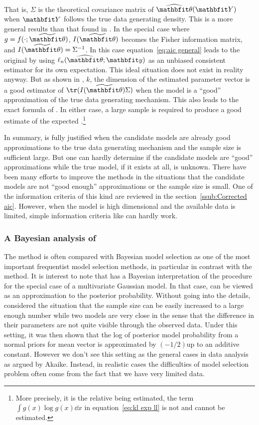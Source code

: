 \documentclass[10pt, hyper, bib, fontset=Lucida,
linespread=1.3, typearearatio=0.75]{marticle}
\begin{document}
That is, $\Sigma$ is the theoretical covariance matrix of $\hbth(\bfY)$ when
$\bfY$ follows the true data generating density. This is a more general
results than that found in \textcite{Akaike:1973uc}. In the special case where
$g = f(\cdot;\tbth)$, $I(\tbth)$ becomes the Fisher information matrix, and
$I(\tbth) = \Sigma^{-1}$. In this case equation~\eqref{eq:aic general} leads
to the original \aic by using $\ell_n(\hbth;\bfy)$ as an unbiased consistent
estimator for its own expectation. This ideal situation does not exist in
reality anyway. But as shown in \textcite{Shibata:1989tm}, $k$, the dimension
of the estimated parameter vector is a good estimator of $\tr(I(\tbth)\Sigma)$
when the model is a ``good'' approximation of the true data generating
mechanism. This also leads to the exact formula of \aic. In either case, a
large sample is required to produce a good estimate of the expected
\kl.\footnote{More precisely, it is the relative \kl being estimated, the term
  $\int g(x)\log g(x)\dd x$ in equation~\eqref{eq:kl exp ll} is not and cannot
  be estimated.}

In summary, \aic is fully justified when the candidate models are already good
approximations to the true data generating mechanism and the sample size is
sufficient large. But one can hardly determine if the candidate models are
``good'' approximations while the true model, if it exists at all, is unknown.
There have been many efforts to improve the \aic methods in the situations
that the candidate models are not ``good enough'' approximations or the sample
size is small. One of the information criteria of this kind are reviewed in
the section~\ref{ssub:Corrected aic}. However, when the model is high
dimensional and the available data is limited, simple information criteria
like \aic can hardly work.

\subsubsection{A Bayesian analysis of \protect\aic}
\label{ssub:A Bayesian analysis of aic}

The \aic method is often compared with Bayesian model selection as one of
the most important frequentist model selection methods, in particular in
contrast with the \bic method. It is interest to note that
\textcite{Akaike:1978ti} has a Bayesian interpretation of the \aic procedure
for the special case of a multivariate Gaussian model. In that case, \aic can
be viewed as an approximation to the posterior probability. Without going into
the details, \textcite{Akaike:1978ti} considered the situation that the sample
size can be easily increased to a large enough number while two models are
very close in the sense that the difference in their parameters are not quite
visible through the observed data. Under this setting, it was then shown that
the log of posterior model probability from a normal priors for mean vector is
approximated by $(-1/2)$\aic up to an additive constant. However we don't see
this setting as the general cases in data analysis as argued by Akaike.
Instead, in realistic cases the difficulties of model selection problem often
come from the fact that we have very limited data.
\end{document}

